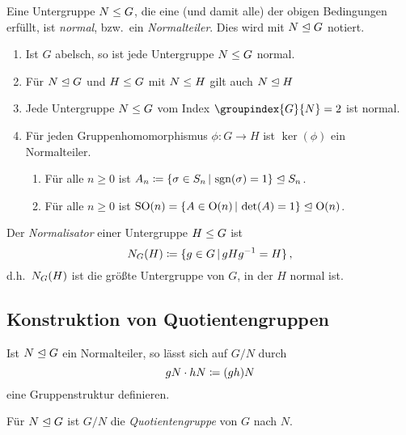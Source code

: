 \begin{definition}
  Eine Untergruppe $N \mathrel{\leq} G$, die eine \textup(und damit alle\textup) der obigen Bedingungen erfüllt, ist \emph{normal}, bzw.\ ein \emph{Normalteiler}.
  Dies wird mit $N \mathrel{\trianglelefteq} G$ notiert.
\end{definition}

\begin{example}
  \begin{enumerate}
    \item
      Ist $G$ abelsch, so ist jede Untergruppe $N \mathrel{\leq} G$ normal.
    \item
      Für $N \mathrel{\trianglelefteq} G$ und $H \mathrel{\leq} G$ mit $N \mathrel{\leq} H$ gilt auch $N \mathrel{\trianglelefteq} H$
    \item
      Jede Untergruppe $N \mathrel{\leq} G$ vom Index $\groupindex{G}{N} = 2$ ist normal.
    \item
      Für jeden Gruppenhomomorphismus $\phi \colon G \to H$ ist $\ker(\phi)$ ein Normalteiler.
      \begin{enumerate}
        \item
          Für alle $n \geq 0$ ist $A_n \defined \{\sigma \in S_n \suchthat \sign(\sigma) = 1\} \normalgroup S_n$.
        \item
          Für alle $n \geq 0$ ist $\sorthogonal{n} = \{A \in \orthogonal{n} \suchthat \det(A) = 1\} \normalgroup \orthogonal{n}$.
      \end{enumerate}
  \end{enumerate}
\end{example}

\begin{definition}
  Der \emph{Normalisator} einer Untergruppe $H \mathrel{\leq} G$ ist
  \[
              \normalizer{G}{H}
    \defined  \{ g \in G \suchthat gHg^{-1} = H \} \,,
  \]
  d.h.\ $N_{G}(H)$ ist die größte Untergruppe von $G$, in der $H$ normal ist.
\end{definition}




\subsection{Konstruktion von Quotientengruppen}

Ist $N \mathrel{\trianglelefteq} G$ ein Normalteiler, so lässt sich auf $G/N$ durch
\[
            gN
  \cdot     hN
  \coloneqq  (gh)N
\]
eine Gruppenstruktur definieren.

\begin{definition}
  Für $N \mathrel{\trianglelefteq} G$ ist $G/N$ die \emph{Quotientengruppe} von $G$ nach $N$.
\end{definition}

